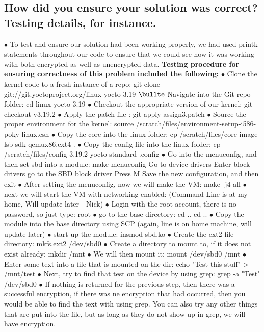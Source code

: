 \documentclass[letterpaper,10pt,fleqn,draftclsnofoot,onecolumn]{IEEEtran}
\begin{document}
	\subsection{How did you ensure your solution was correct? Testing details, for instance.}
	$\bullet$ To test and ensure our solution had been working properly, we had used printk statements throughout our code to ensure that we could see how it was working with both encrypted as well as unencrypted data.
	\textbf{Testing procedure for ensuring correctness of this problem included the following:}
	$\bullet$ Clone the kernel code to a fresh instance of a repo: git clone git://git.yoctoproject.org/linux-yocto-3.19
	$\bullte$ Navigate into the Git repo folder: cd linux-yocto-3.19
	$\bullet$ Checkout the appropriate version of our kernel: git checkout v3.19.2
	$\bullet$ Apply the patch file : git apply assign3.patch
	$\bullet$ Source the proper environment for the kernel: source /scratch/files/environment-setup-i586-poky-linux.csh
	$\bullet$ Copy the core into the linux folder: cp /scratch/files/core-image-lsb-sdk-qemux86.ext4 .
	$\bullet$ Copy the config file into the linux folder: cp /scratch/files/config-3.19.2-yocto-standard .config
	$\bullet$ Go into the menuconfig, and then set sbd into a module:
	make menuconfig
	Go to device drivers
	Enter block drivers
	go to the SBD block driver
	Press M
	Save the new configuration, and then exit
	$\bullet$ After setting the menuconfig, now we will make the VM: make -j4 all
	$\bullet$ next we will start the VM with networking enabled: (Command Line is at my home, Will update later - Nick)
	$\bullet$ Login with the root account, there is no password, so just type: root
	$\bullet$ go to the base directory: cd .. cd ..
	$\bullet$ Copy the module into the base directory using SCP (again, line is on home machine, will update later)
	$\bullet$ start up the module: insmod sbd.ko
	$\bullet$ Create the ext2 file directory: mkfs.ext2 /dev/sbd0
	$\bullet$ Create a directory to mount to, if it does not exist already: mkdir /mnt
	$\bullet$ We will then mount it: mount /dev/sbd0 /mnt
	$\bullet$ Enter some text into a file that is mounted on the dir: echo "Test this stuff" > /mnt/test
	$\bullet$ Next, try to find that test on the device by using grep: grep -a "Test" /dev/sbd0
	$\bullet$ If nothing is returned for the previous step, then there was a successful encryption, if there was ne encryption that had occurred, then you would be able to find the text with using grep. You can also try any other things that are put into the file, but as long as they do not show up in grep, we will have encryption.
	
\end{document}
